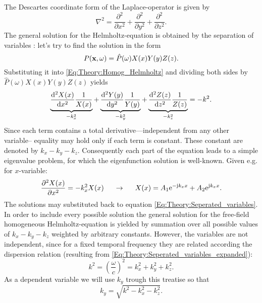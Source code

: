 The Descartes coordinate form of the Laplace-operator is given by
\begin{equation}
\nabla^2 = \frac{\partial^2}{\partial x^2} + \frac{\partial^2}{\partial y^2} +  \frac{\partial^2}{\partial z^2}.
\end{equation}
The general solution for the Helmholtz-equation is obtained by the separation of variables \cite{Devaney2012}: let's try to find the solution in the form
\begin{equation}
P(\mathbf{x},\omega) = \hat{P}(\omega) X(x)Y(y)Z(z).
\label{Eq:Theory:Seperated_variables}
\end{equation}
Substituting it into \eqref{Eq:Theory:Homog_Helmholtz} and dividing both sides by $\hat{P}(\omega) X(x)Y(y)Z(z)$ yields
\begin{equation}
\underbrace{\frac{\mathrm{d}^2 X(x)}{\mathrm{d} x^2}\frac{1}{X(x)}}_{-k_x^2} + 
\underbrace{\frac{\mathrm{d}^2 Y(y)}{\mathrm{d} y^2}\frac{1}{Y(y)}}_{-k_y^2} + 
\underbrace{\frac{\mathrm{d}^2 Z(z)}{\mathrm{d} z^2}\frac{1}{Z(z)}}_{-k_z^2}
= - k^2.
\label{Eq:Theory:Seperated_variables_expanded}
\end{equation}
Since each term contains a total derivative---independent from any other variable-- equality may hold only if each term is constant. These constant are denoted by $k_x-k_y-k_z$. Consequently each part of the equation leads to a simple eigenvalue problem, for which the eigenfunction solution is well-known. Given e.g. for $x$-variable:
\begin{equation}
\frac{\partial^2 X(x)}{\partial x^2} = -k_x^2 X(x) \hspace{5mm} \rightarrow \hspace{5mm} X(x) = A_1 \mathrm{e}^{-\mathrm{j} k_x x} + A_2 \mathrm{e}^{\mathrm{j} k_x x}.
\end{equation}
The solutions may substituted back to equation \eqref{Eq:Theory:Seperated_variables}. In order to include every possible solution the general solution for the free-field homogeneous Helmholtz-equation is yielded by summation over all possible values of $k_x-k_y-k_z$ weighted by arbitrary constants. However, the variables are not independent, since for a fixed temporal frequency they are related according the dispersion relation
(resulting from \eqref{Eq:Theory:Seperated_variables_expanded}):
\begin{equation}
k^2 = \left( \frac{\omega}{c} \right)^2 = k_x^2 + k_y^2 + k_z^2.
\end{equation}
As a dependent variable we will use $k_y$ trough this treatise so that
\begin{equation}
k_y = \sqrt{ k^2 - k_x^2 - k_z^2 }.
\end{equation}
